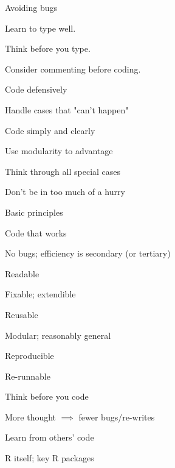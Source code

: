 \documentclass[12pt,t]{beamer}
\begin{document}
\begin{frame}{Avoiding bugs}

\bbi
\item Learn to type well.
\item Think before you type.
\item Consider commenting before coding.
\item Code defensively
  \bi
  \item Handle cases that "can't happen"
  \ei
\item Code simply and clearly
\item Use modularity to advantage
\item Think through all special cases
\item Don't be in too much of a hurry
\ei

\end{frame}





\begin{frame}{Basic principles}

\vspace{18pt}

\bi
\item Code that works
    \bi
    \item[] No bugs; efficiency is secondary (or tertiary)
    \ei
\item Readable
    \bi
    \item[] Fixable; extendible
    \ei
\item Reusable
    \bi
    \item[] Modular; reasonably general
    \ei
\item Reproducible
    \bi
    \item[] Re-runnable
    \ei
\item Think before you code
    \bi
    \item[] More thought $\implies$ fewer bugs/re-writes
    \ei
\item Learn from others' code
    \bi
    \item[] R itself; key R packages
    \ei
\ei

\end{frame}
\end{document}
